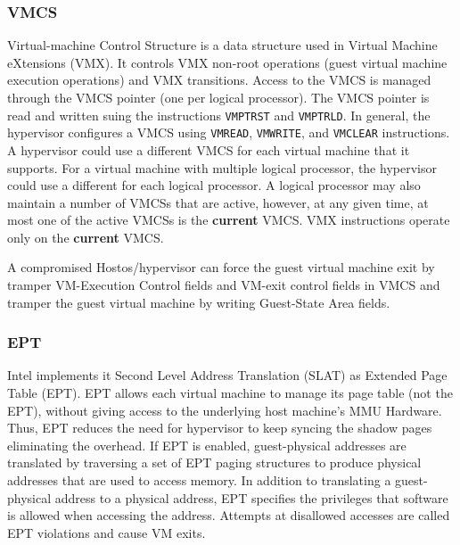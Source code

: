 \subsubsection{VMCS}%
\label{ssub:vmcs}
Virtual-machine Control Structure is a data structure used in Virtual Machine eXtensions (VMX). It controls VMX non-root operations (guest virtual machine execution operations) and VMX transitions. Access to the VMCS is managed through the VMCS pointer (one per logical processor). The VMCS pointer is read and written suing the instructions \verb|VMPTRST| and \verb|VMPTRLD|. In general, the hypervisor configures a VMCS using \verb|VMREAD|, \verb|VMWRITE|, and \verb|VMCLEAR| instructions. A hypervisor could use a different VMCS for each virtual machine that it supports. For a virtual machine with multiple logical processor, the hypervisor could use a different for each logical processor. A logical processor may also maintain a number of VMCSs that are active, however, at any given time, at most one of the active VMCSs is the \textbf{current} VMCS. VMX instructions operate only on the \textbf{current} VMCS. 

A compromised Hostos/hypervisor can force the guest virtual machine exit by tramper VM-Execution Control fields and VM-exit control fields in VMCS and tramper the guest virtual machine by writing Guest-State Area fields. 




\subsubsection{EPT}%
\label{ssub:ept}
Intel implements it Second Level Address Translation (SLAT) as Extended Page Table (EPT). 
EPT allows each virtual machine to manage its page table (not the EPT), without giving access to the underlying host machine's MMU Hardware. Thus, EPT reduces the need for hypervisor to keep syncing the shadow pages eliminating the overhead.
If EPT is enabled, guest-physical addresses are translated by traversing a set of EPT paging structures to produce physical addresses that are used to access memory.
In addition to translating a guest-physical address to a physical address, EPT specifies the privileges that software is allowed when accessing the address. Attempts at disallowed accesses are called EPT violations and cause VM exits.


